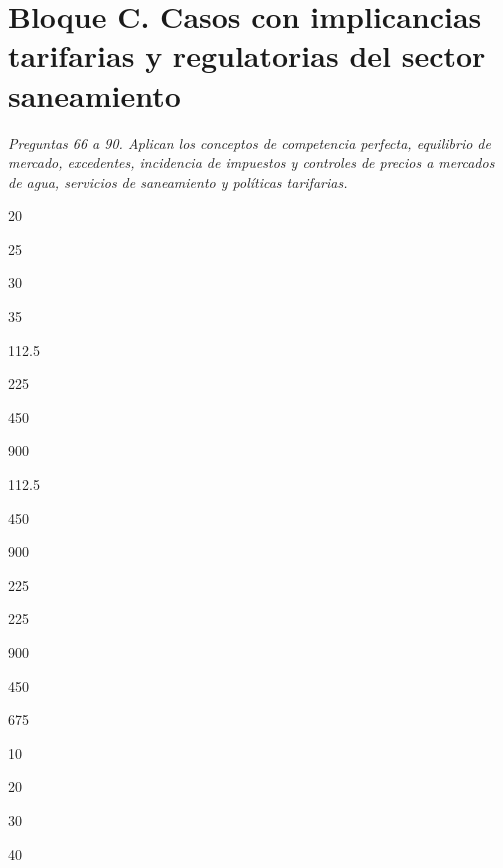 \section*{Bloque C. Casos con implicancias tarifarias y regulatorias del sector saneamiento}

\noindent\textit{Preguntas 66 a 90. Aplican los conceptos de competencia perfecta, equilibrio de mercado, excedentes, incidencia de impuestos y controles de precios a mercados de agua, servicios de saneamiento y políticas tarifarias.}

\begin{opts}
    \item 20
    \item 25
    \item 30
    \item 35
\end{opts}

\begin{opts}
    \item 112.5
    \item 225
    \item 450
    \item 900
\end{opts}

\begin{opts}
    \item 112.5
    \item 450
    \item 900
    \item 225
\end{opts}

\begin{opts}
    \item 225
    \item 900
    \item 450
    \item 675
\end{opts}

\begin{opts}
    \item 10
    \item 20
    \item 30
    \item 40
\end{opts}

